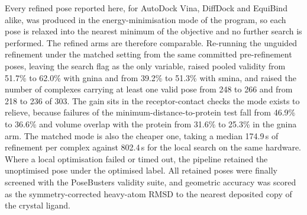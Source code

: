 Every refined pose reported here, for AutoDock Vina, DiffDock and EquiBind alike, was produced in the energy-minimisation mode of the program, so each pose is relaxed into the nearest minimum of the objective and no further search is performed. The refined arms are therefore comparable. Re-running the unguided refinement under the matched setting from the same committed pre-refinement poses, leaving the search flag as the only variable, raised pooled validity from 51.7\% to 62.0\% with gnina and from 39.2\% to 51.3\% with smina, and raised the number of complexes carrying at least one valid pose from 248 to 266 and from 218 to 236 of 303. The gain sits in the receptor-contact checks the mode exists to relieve, because failures of the minimum-distance-to-protein test fall from 46.9\% to 36.6\% and volume overlap with the protein from 31.6\% to 25.3\% in the gnina arm. The matched mode is also the cheaper one, taking a median 174.9\,s of refinement per complex against 802.4\,s for the local search on the same hardware. Where a local optimisation failed or timed out, the pipeline retained the unoptimised pose under the optimised label. All retained poses were finally screened with the PoseBusters validity suite, and geometric accuracy was scored as the symmetry-corrected heavy-atom RMSD to the nearest deposited copy of the crystal ligand.

